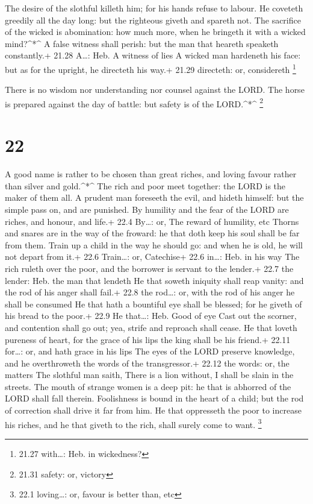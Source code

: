  The desire of the slothful killeth him; for his hands
refuse to labour.  He coveteth greedily all the day long:
but the righteous giveth and spareth not.  The sacrifice of
the wicked is abomination: how much more, when he bringeth it with a
wicked mind?\^{}*\^{}  A false witness shall perish: but
the man that heareth speaketh constantly.+ 21.28 A\ldots: Heb. A witness
of lies  A wicked man hardeneth his face: but as for the
upright, he directeth his way.+ 21.29 directeth: or, considereth
\footnote{21.27 with\ldots: Heb. in wickedness?}

 There is no wisdom nor understanding nor counsel against
the LORD.  The horse is prepared against the day of battle:
but safety is of the LORD.\^{}*\^{} \footnote{21.31 safety: or, victory}

\hypertarget{section-21}{%
\section{22}\label{section-21}}

 A good name is rather to be chosen than great riches, and
loving favour rather than silver and gold.\^{}*\^{}  The
rich and poor meet together: the LORD is the maker of them all.
 A prudent man foreseeth the evil, and hideth himself: but
the simple pass on, and are punished.  By humility and the
fear of the LORD are riches, and honour, and life.+ 22.4 By\ldots: or,
The reward of humility, etc  Thorns and snares are in the
way of the froward: he that doth keep his soul shall be far from them.
 Train up a child in the way he should go: and when he is
old, he will not depart from it.+ 22.6 Train\ldots: or, Catechise+ 22.6
in\ldots: Heb. in his way  The rich ruleth over the poor,
and the borrower is servant to the lender.+ 22.7 the lender: Heb. the
man that lendeth  He that soweth iniquity shall reap vanity:
and the rod of his anger shall fail.+ 22.8 the rod\ldots: or, with the
rod of his anger he shall be consumed  He that hath a
bountiful eye shall be blessed; for he giveth of his bread to the poor.+
22.9 He that\ldots: Heb. Good of eye  Cast out the scorner,
and contention shall go out; yea, strife and reproach shall cease.
 He that loveth pureness of heart, for the grace of his
lips the king shall be his friend.+ 22.11 for\ldots: or, and hath grace
in his lips  The eyes of the LORD preserve knowledge, and
he overthroweth the words of the transgressor.+ 22.12 the words: or, the
matters  The slothful man saith, There is a lion without, I
shall be slain in the streets.  The mouth of strange women
is a deep pit: he that is abhorred of the LORD shall fall therein.
 Foolishness is bound in the heart of a child; but the rod
of correction shall drive it far from him.  He that
oppresseth the poor to increase his riches, and he that giveth to the
rich, shall surely come to want. \footnote{22.1 loving\ldots: or, favour
  is better than, etc}

